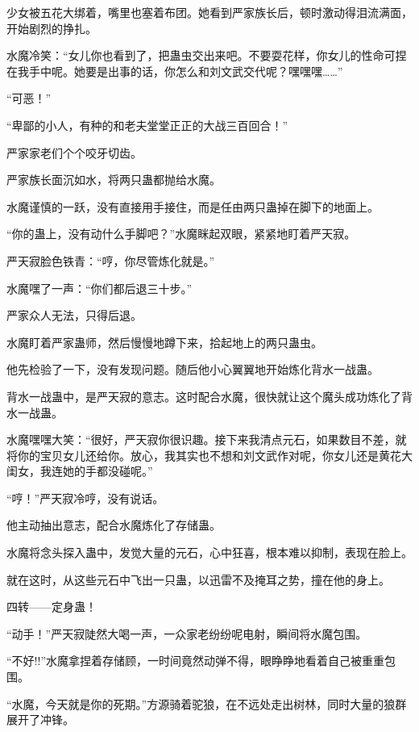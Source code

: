 \begin{this_body}
少女被五花大绑着，嘴里也塞着布团。她看到严家族长后，顿时激动得泪流满面，开始剧烈的挣扎。

水魔冷笑：“女儿你也看到了，把蛊虫交出来吧。不要耍花样，你女儿的性命可捏在我手中呢。她要是出事的话，你怎么和刘文武交代呢？嘿嘿嘿……”

“可恶！”

“卑鄙的小人，有种的和老夫堂堂正正的大战三百回合！”

严家家老们个个咬牙切齿。

严家族长面沉如水，将两只蛊都抛给水魔。

水魔谨慎的一跃，没有直接用手接住，而是任由两只蛊掉在脚下的地面上。

“你的蛊上，没有动什么手脚吧？”水魔眯起双眼，紧紧地盯着严天寂。

严天寂脸色铁青：“哼，你尽管炼化就是。”

水魔嘿了一声：“你们都后退三十步。”

严家众人无法，只得后退。

水魔盯着严家蛊师，然后慢慢地蹲下来，拾起地上的两只蛊虫。

他先检验了一下，没有发现问题。随后他小心翼翼地开始炼化背水一战蛊。

背水一战蛊中，是严天寂的意志。这时配合水魔，很快就让这个魔头成功炼化了背水一战蛊。

水魔嘿嘿大笑：“很好，严天寂你很识趣。接下来我清点元石，如果数目不差，就将你的宝贝女儿还给你。放心，我其实也不想和刘文武作对呢，你女儿还是黄花大闺女，我连她的手都没碰呢。”

“哼！”严天寂冷哼，没有说话。

他主动抽出意志，配合水魔炼化了存储蛊。

水魔将念头探入蛊中，发觉大量的元石，心中狂喜，根本难以抑制，表现在脸上。

就在这时，从这些元石中飞出一只蛊，以迅雷不及掩耳之势，撞在他的身上。

四转——定身蛊！

“动手！”严天寂陡然大喝一声，一众家老纷纷呢电射，瞬间将水魔包围。

“不好!!”水魔拿捏着存储顾，一时间竟然动弹不得，眼睁睁地看着自己被重重包围。

“水魔，今天就是你的死期。”方源骑着驼狼，在不远处走出树林，同时大量的狼群展开了冲锋。

\end{this_body}

